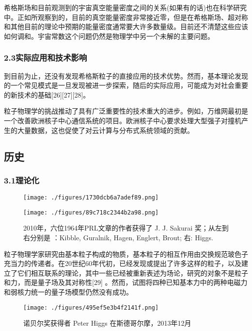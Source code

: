 希格斯场和目前观测到的宇宙真空能量密度之间的关系(如果有的话)也在科学研究中。正如所观察到的，目前的真空能量密度非常接近零，但是在希格斯场、超对称和其他目前的理论中预期的能量密度通常要大许多数量级。目前还不清楚这些应该如何调和。宇宙常数这个问题仍然是物理学中另一个未解的主要问题。

\subsubsection{2.3实际应用和技术影响}

到目前为止，还没有发现希格斯粒子的直接应用的技术优势。然而，基本理论发现的一个常见模式是一旦发现被进一步探索，随后的实际应用，可能成为对社会重要的新技术的基础[26][27][28]。

粒子物理学的挑战推动了具有广泛重要性的技术重大的进步。例如，万维网最初是一个改善欧洲核子中心通信系统的项目。欧洲核子中心要求处理大型强子对撞机产生的大量数据，这也促使了对云计算与分布式系统领域的贡献。

\subsection{历史}

\subsubsection{3.1理论化}

\begin{figure}[ht]
\centering
\texttt{[image: ./figures/1730dcb6a7adef89.png]}
\caption\label{fig_Higgs_2}
\end{figure}

\begin{figure}[ht]
\centering
\texttt{[image: ./figures/89c718c2344b2a98.png]}
\caption{2010年，六位1964年PRL文章的作者获得了 J. J. Sakurai 奖；从左到右分别是 ：Kibble, Guralnik, Hagen, Englert, Brout; 右: Higgs.} \label{fig_Higgs_3}
\end{figure}

粒子物理学家研究由基本粒子构成的物质，基本粒子的相互作用由交换规范玻色子充当力的传递者。在20世纪60年代初，已经发现或提出了许多这样的粒子，以及建立了它们相互联系的理论，其中一些已经被重新表述为场论，研究的对象不是粒子和力，而是量子场及其对称性[29] 。然而，试图将四种已知基本力中的两种电磁力和弱核力统一的量子场模型仍然没有成功。

\begin{figure}[ht]
\centering
\texttt{[image: ./figures/495ef5e3b4f2141f.png]}
\caption{诺贝尔奖获得者 Peter Higgs 在斯德哥尔摩，2013年12月} \label{fig_Higgs_4}
\end{figure}

